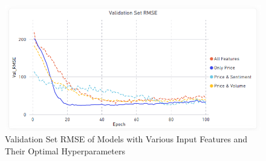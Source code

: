 \documentclass[11pt, a4paper]{article}
\begin{document}
\begin{table}[!h]
    \caption{Validation Set RMSE for ARIMA and LSTM Time-Series Models}
    \label{tab:results_stocks_valset}
    \centering
    \small
\end{table}

\begin{figure}[!h]
    \centering
    \includegraphics[scale = 0.45]{Best_Params_Of_Model_RMSE_Validation_Set.png}
    \caption{Validation Set RMSE of Models with Various Input Features and Their Optimal Hyperparameters}
    \label{fig:lstm_models_rmse_validation_set}
\end{figure}
\end{document}
